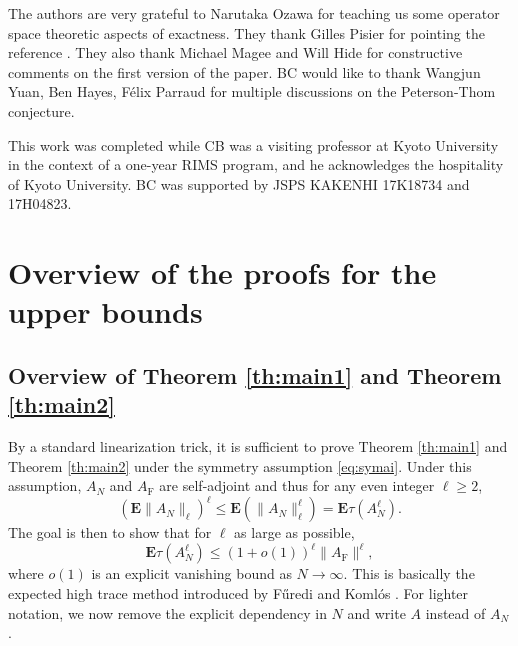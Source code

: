 \documentclass[11pt]{article}
\renewcommand{\star}{{\mathrm{F}}}
\newcommand{\dE}{\mathbf {E}}
\newcommand{\PAR}[1]{{{\left(#1\right)}}} %
\newcommand{\1}{1\!\!{\sf I}}
\begin{document}
The authors are very grateful to Narutaka Ozawa for teaching us some operator space theoretic aspects of exactness. They thank Gilles Pisier for pointing the reference \cite{lehnerthesis}. 
They also thank Michael Magee and Will Hide for constructive comments on the first version of the paper.
BC would like to thank Wangjun Yuan, Ben Hayes, F\'elix Parraud for multiple discussions on the Peterson-Thom conjecture.  

This work was completed while CB was a visiting professor at Kyoto University in the context of a one-year RIMS program, and he acknowledges the hospitality of Kyoto University.  BC was supported by JSPS KAKENHI 17K18734 and 17H04823. 


\section{Overview of the proofs for the upper bounds}


\subsection{Overview of Theorem \ref{th:main1} and Theorem \ref{th:main2}}


By a standard linearization trick, it is sufficient to prove Theorem \ref{th:main1} and Theorem \ref{th:main2} under the symmetry assumption \eqref{eq:symai}. Under this assumption, $A_N$ and $A_\star$ are self-adjoint and thus for any even integer $\ell \geq 2$, 
\begin{equation*}
(\dE \| A_N \|_\ell ) ^\ell \leq  \dE  ( \| A_N \|^\ell_\ell) = \dE \tau \PAR{  A_N^\ell }.
\end{equation*}
The goal is then to show that for $\ell$ as large as possible, 
\begin{equation}\label{eq:Ostep0}
\dE \tau \PAR{  A_N^\ell } \leq  (1 + o(1))^\ell \| A_\star\|^\ell,
\end{equation}
where $o(1)$ is an explicit vanishing bound as $N \to \infty$. This is basically the expected high trace method introduced by F\H{u}redi and Koml\'os \cite{MR637828}. For lighter notation, we now remove the explicit dependency in $N$ and write $A$ instead of $A_N$.
\end{document}
